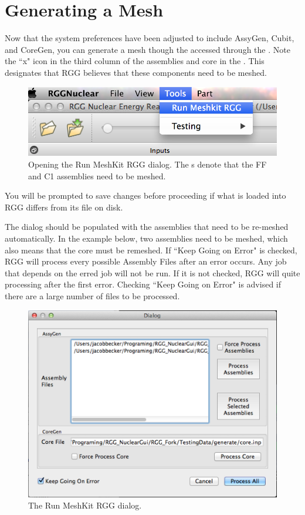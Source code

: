 \section{Generating a Mesh}

Now that the system preferences have been adjusted to include AssyGen, Cubit, and CoreGen, you can generate a mesh  though the  accessed through the .  Note the ``x" icon in the third column of the assemblies and core in the .  This designates that RGG believes that these components need to be meshed.

\begin{figure}[H]
	\begin{center}
		\includegraphics[width=0.5\linewidth]{Images/mesh-3.png}
		\caption{Opening the Run MeshKit RGG dialog.  The s denote that the FF and C1 assemblies need to be meshed.}
		\label{fig:Mesh3}
	\end{center}
\end{figure}

You will be prompted to save changes before proceeding if what is loaded into RGG differs from its file on disk.

The dialog should be populated with the assemblies that need to be re-meshed automatically.  In the example below, two assemblies need to be meshed, which also means that the core must be remeshed.  If ``Keep Going on Error" is checked, RGG will process every possible Assembly Files after an error occurs.  Any job that depends on the erred job will not be run.  If it is not checked, RGG will quite processing after the first error.  Checking ``Keep Going on Error" is advised if there are a large number of files to be processed.

\begin{figure}[H]
	\begin{center}
		\includegraphics[width=0.5\linewidth]{Images/mesh-4.png}
		\caption{The Run MeshKit RGG dialog.}
		\label{fig:Mesh4}
	\end{center}
\end{figure}

